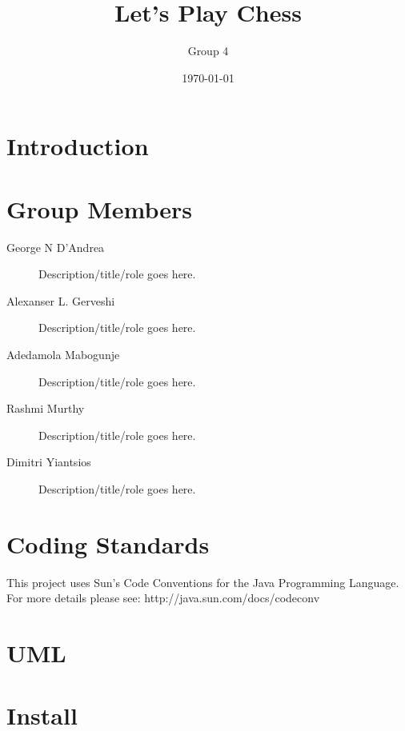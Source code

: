 \documentclass[a4paper,12pt]{report} %
\begin{document}
\title{Let's Play Chess}
\author{Group 4}
\date{\today}
\maketitle

\section{Introduction}

\section{Group Members}

\begin{description}
\item[George N D'Andrea]
Description/title/role goes here.

\item[Alexanser L. Gerveshi]
Description/title/role goes here.

\item[Adedamola Mabogunje]
Description/title/role goes here.

\item[Rashmi Murthy]
Description/title/role goes here.

\item[Dimitri Yiantsios]
Description/title/role goes here.
\end{description}

\section{Coding Standards}

This project uses Sun's Code Conventions for the Java Programming Language.
For more details please see:  http://java.sun.com/docs/codeconv

\section{UML}

\section{Install}

\end{document}
